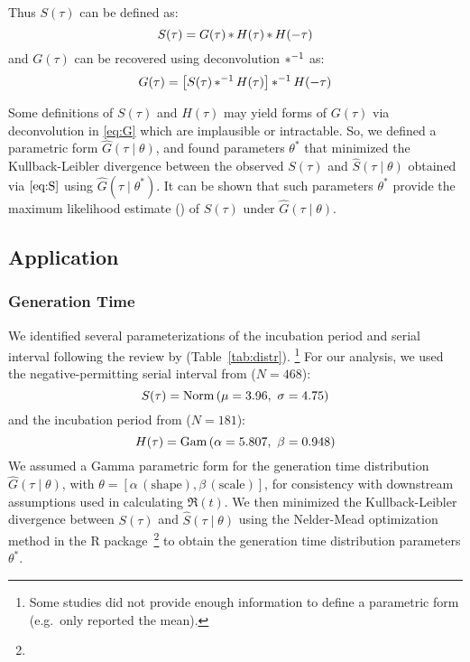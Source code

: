 Thus $S(\tau)$ can be defined as:
\begin{equation}\label{eq:S}
  S(\tau) = G(\tau) \mathop{\ast} H(\tau) \mathop{\ast} H(-\tau)
\end{equation}
and $G(\tau)$ can be recovered using deconvolution $\mathop{\ast^{-1}}$ as:
\begin{equation}\label{eq:G}
  G(\tau) = \left[S(\tau) \mathop{\ast^{-1}} H(\tau)\right] \mathop{\ast^{-1}} H(-\tau)
\end{equation}
\par
Some definitions of $S(\tau)$ and $H(\tau)$
may yield forms of $G(\tau)$ via deconvolution in \eqref{eq:G}
which are implausible or intractable.
So, we defined a parametric form ${\hat{G}(\tau\mid\theta)}$,
and found parameters $\theta^*$ that
minimized the Kullback-Leibler divergence between
the observed $S(\tau)$ and ${\hat{S}(\tau\mid\theta)}$
obtained via $\eqref{eq:S}$ using ${\hat{G}(\tau\mid\theta^*)}$.
It can be shown that such parameters $\theta^*$
provide the maximum likelihood estimate (\mle) of
$S(\tau)$ under $\hat{G}(\tau\mid\theta)$.
\subsection{Application}
\subsubsection{Generation Time}
We identified several parameterizations of
the \covid incubation period and serial interval
following the review by \textcite{Park2020} (Table~\ref{tab:distr}).%
\footnote{Some studies did not provide enough information
  to define a parametric form (e.g.\ only reported the mean).}
For our analysis, we used
the negative-permitting serial interval from \cite{Du2020} ({$N=468$}):
\begin{equation}
S(\tau) = \mathop{\mathrm{Norm}}{\left(\mu=3.96,~\sigma=4.75\right)}
\end{equation}
and the incubation period from \cite{Lauer2020} ({$N=181$}):
\begin{equation}
H(\tau) = \mathop{\mathrm{Gam}}{\left(\alpha=5.807,~\beta=0.948\right)}
\end{equation}
We assumed a Gamma parametric form for the generation time distribution
${\hat{G}(\tau\mid\theta)}$, with
$\theta = [\alpha\,(\textrm{shape}), \beta\,(\textrm{scale})]$,
for consistency with downstream assumptions used in calculating $\Re(t)$.
We then minimized the Kullback-Leibler divergence between
$S(\tau)$ and $\hat{S}(\tau\mid\theta)$ using
the Nelder-Mead optimization method
in the  R package\,%
\footnote{}
to obtain the \mle generation time distribution parameters $\theta^*$.
